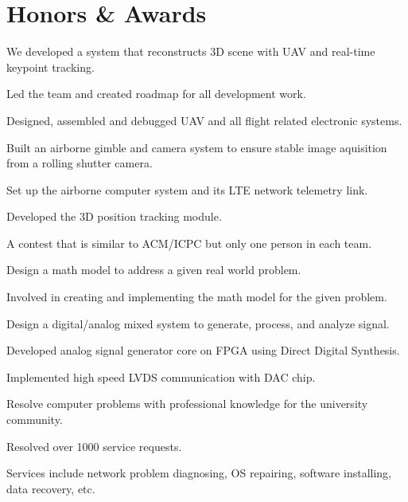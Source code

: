 \documentclass[letterpaper,11pt]{article}
\newcommand{\resumeSubItem}[1]{{\item #1}}
\newcommand{\resumeSubHeadingListStart}{\begin{itemize}[leftmargin=0pt,label={}]}
\newcommand{\resumeSubHeadingListEnd}{\end{itemize}}
\begin{document}
\resShowHonorsAndAwards\section{Honors \& Awards}{
    \resumeSubHeadingListStart
        {We developed a system that reconstructs 3D scene with UAV and real-time keypoint tracking.}{
            \resumeSubItem{Led the team and created roadmap for all development work.}
            \resumeSubItem{Designed, assembled and debugged UAV and all flight related electronic systems.}
            \resumeSubItem{Built an airborne gimble and camera system to ensure stable image aquisition from a rolling shutter camera.}
            \resumeSubItem{Set up the airborne computer system and its LTE network telemetry link.}
            \resumeSubItem{Developed the 3D position tracking module.}
        }

        {A contest that is similar to ACM/ICPC but only one person in each team.}{}

        {Design a math model to address a given real world problem.}{
            \resumeSubItem{Involved in creating and implementing the math model for the given problem.}
        }

        {Design a digital/analog mixed system to generate, process, and analyze signal.}{
            \resumeSubItem{Developed analog signal generator core on FPGA using Direct Digital Synthesis.}
            \resumeSubItem{Implemented high speed LVDS communication with DAC chip.}
        }

        {Resolve computer problems with professional knowledge for the university community.}{
            \resumeSubItem{Resolved over 1000 service requests.}
            \resumeSubItem{Services include network problem diagnosing, OS repairing, software installing, data recovery, etc.}
        }
    \resumeSubHeadingListEnd
}
\end{document}
